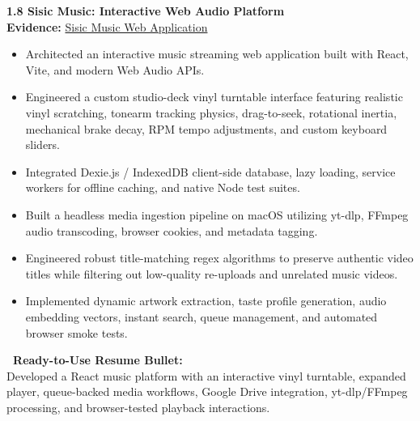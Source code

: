 \documentclass[10pt,a4paper]{article}
\newcommand{\statusprototype}{\tcbox[on line, colback=prototypebg, colframe=prototype!50!white, size=small, arc=2pt, boxrule=0.5pt]{\scriptsize\bfseries\color{prototype}\faIcon{flask}\ PROTOTYPE / PARTIAL}}
\begin{document}
\begin{projectcard}
  \textbf{\large 1.8 Sisic Music: Interactive Web Audio Platform} \hfill \statusprototype\\[2pt]
  {\footnotesize\color{textmuted}\textbf{Evidence:} \underline{Sisic Music Web Application}}
  \begin{itemize}[leftmargin=14pt, itemsep=1.5pt, topsep=2pt]
    \item Architected an interactive music streaming web application built with React, Vite, and modern Web Audio APIs.
    \item Engineered a custom studio-deck vinyl turntable interface featuring realistic vinyl scratching, tonearm tracking physics, drag-to-seek, rotational inertia, mechanical brake decay, RPM tempo adjustments, and custom keyboard sliders.
    \item Integrated Dexie.js / IndexedDB client-side database, lazy loading, service workers for offline caching, and native Node test suites.
    \item Built a headless media ingestion pipeline on macOS utilizing yt-dlp, FFmpeg audio transcoding, browser cookies, and metadata tagging.
    \item Engineered robust title-matching regex algorithms to preserve authentic video titles while filtering out low-quality re-uploads and unrelated music videos.
    \item Implemented dynamic artwork extraction, taste profile generation, audio embedding vectors, instant search, queue management, and automated browser smoke tests.
  \end{itemize}
  \begin{resumebox}
    \textbf{\color{accent}\ Ready-to-Use Resume Bullet:}\\
    Developed a React music platform with an interactive vinyl turntable, expanded player, queue-backed media workflows, Google Drive integration, yt-dlp/FFmpeg processing, and browser-tested playback interactions.
  \end{resumebox}
\end{projectcard}

\newpage
\end{document}
